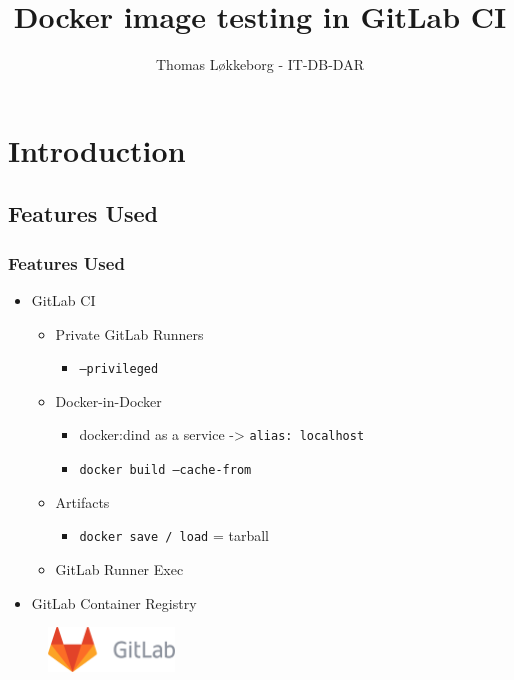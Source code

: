 \documentclass[14pt,aspectratio=169]{beamer}
\title[]{Docker image testing in GitLab CI}
\author[Author]{Thomas Løkkeborg - IT-DB-DAR}
\begin{document}
\cernSplashBlue

{
  \frame{\titlepage}
}
\setcounter{framenumber}{0}



\section{Introduction}

\subsection{Features Used}

\begin{frame}
  \frametitle{Features Used}
    \begin{itemize}
      \item GitLab CI
      \begin{itemize}
        \item Private GitLab Runners
        \begin{itemize}
          \item \texttt{--privileged}
        \end{itemize}
        \item Docker-in-Docker
        \begin{itemize}
          \item docker:dind as a service -> \texttt{alias: localhost}
          \item \texttt{docker build --cache-from}
        \end{itemize}
        \item Artifacts
        \begin{itemize}
          \item \texttt{docker save / load} = tarball
        \end{itemize}
        \item GitLab Runner Exec
      \end{itemize}
      \item GitLab Container Registry
    \end{itemize}
  \begin{figure}
    \includegraphics[width=0.3\textwidth]{images/gitlab.png}
  \end{figure}
\end{frame}
\end{document}
